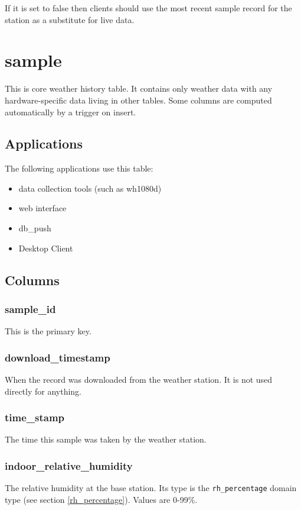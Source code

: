 \documentclass[a4paper,10pt]{book}
\begin{document}
If it is set to false then clients should use the most recent sample record for the station as a substitute for live data.

\section{sample}
This is core weather history table. It contains only weather data with any hardware-specific data living in other tables. Some columns are computed automatically by a trigger on insert.

\subsection{Applications}
The following applications use this table:
\begin{itemize}
\item data collection tools (such as wh1080d)
\item web interface
\item db\_push
\item Desktop Client
\end{itemize}

\subsection{Columns}
\subsubsection{sample\_id}
This is the primary key.

\subsubsection{download\_timestamp}
When the record was downloaded from the weather station. It is not used directly for anything.

\subsubsection{time\_stamp}
The time this sample was taken by the weather station. 

\subsubsection{indoor\_relative\_humidity}
The relative humidity at the base station. Its type is the \verb|rh_percentage| domain type (see section \ref{rh_percentage}). Values are 0-99\%.
\end{document}

